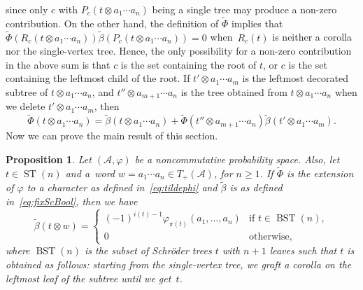 \documentclass[pdftex]{sigma}%
\numberwithin{equation}{section}
\newtheorem{Proposition}[Theorem]{Proposition}
 { \theoremstyle{definition}
\newtheorem{Definition}[Theorem]{Definition}
\newtheorem{Example}[Theorem]{Example}
\newtheorem{Remark}[Theorem]{Remark} }
\newcommand{\A}{\mathcal{A}}
\newcommand{\ST}{\operatorname{ST}}
\begin{document}
since only $c$ with $P_c(t\otimes a_1\cdots a_n)$ being a single tree may produce a non-zero contribution. On the other hand, the definition of $\tilde\Phi$ implies that $\tilde{\Phi} (R_c(t\otimes a_1\cdots a_n)) \tilde\beta(P_c(t\otimes a_1\cdots a_n))=0$ when~$R_c(t)$ is neither a corolla nor the single-vertex tree. Hence, the only possibility for a non-zero contribution in the above sum is that $c$ is the set containing the root of $t$, or $c$ is the set containing the leftmost child of the root. If $t'\otimes a_1\cdots a_m$ is the leftmost decorated subtree of $t\otimes a_1\cdots a_n$, and $t''\otimes a_{m+1}\cdots a_n$ is the tree obtained from $t\otimes a_1\cdots a_n$ when we delete $t'\otimes a_1\cdots a_m$, then
\begin{equation}
\label{eq:ForBool}
\tilde\Phi(t\otimes a_1\cdots a_n) = \tilde\beta(t\otimes a_1\cdots a_n) + \tilde\Phi(t'' \otimes a_{m+1}\cdots a_n) \tilde{\beta}(t'\otimes a_{1}\cdots a_m).
\end{equation}
Now we can prove the main result of this section.
\begin{Proposition}
Let $(\A,\varphi)$ be a noncommutative probability space. Also, let $t \in \ST(n)$ and a~word $w=a_1\cdots a_n\in T_+(\A)$, for $n\geq1$. If $\tilde{\Phi}$ is the extension of $\varphi$ to a character as defined in~\eqref{eq:tildephi} and $\tilde\beta$ is as defined in~\eqref{eq:fixScBool}, then we have
\begin{equation} \label{eq:tildebeta}
 \tilde\beta(t \otimes w)
	= \begin{cases} (-1)^{i(t)-1}\varphi_{\pi(t)}(a_1,\dots,a_n) & \text{if $t\in \operatorname{BST}(n)$},\\ 0& \text{otherwise}, \end{cases}
\end{equation}
where $\operatorname{BST}(n)$ is the subset of Schr\"oder trees $t$ with $n+1$ leaves such that $t$ is obtained as follows: starting from the single-vertex tree, we graft a corolla on the leftmost leaf of the subtree until we get~$t$.
\end{Proposition}
\end{document}
